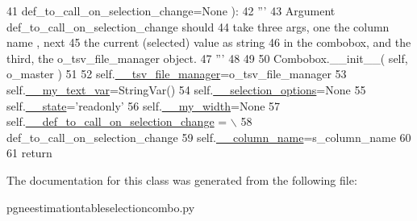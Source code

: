 \begin{DoxyCode}
41                         def\_to\_call\_on\_selection\_change=\textcolor{keywordtype}{None} ):
42         \textcolor{stringliteral}{'''}
43 \textcolor{stringliteral}{        Argument def\_to\_call\_on\_selection\_change should}
44 \textcolor{stringliteral}{        take three args, one the column name , next}
45 \textcolor{stringliteral}{        the current (selected) value as string }
46 \textcolor{stringliteral}{        in the combobox, and the third, the o\_tsv\_file\_manager object.}
47 \textcolor{stringliteral}{        '''}
48 
49 
50         Combobox.\_\_init\_\_( self, o\_master )
51 
52         self.\hyperlink{classnegui_1_1pgneestimationtableselectioncombo_1_1PGNeEstTableSelectionCombo_ab5d15ff71c8791901a27773d66d94359}{\_\_tsv\_file\_manager}=o\_tsv\_file\_manager
53         self.\hyperlink{classnegui_1_1pgneestimationtableselectioncombo_1_1PGNeEstTableSelectionCombo_ada055ddd07374f0f960635ba63ac1e38}{\_\_my\_text\_var}=StringVar()
54         self.\hyperlink{classnegui_1_1pgneestimationtableselectioncombo_1_1PGNeEstTableSelectionCombo_a6fd1aa0595a6574be037b1c238f12050}{\_\_selection\_options}=\textcolor{keywordtype}{None}
55         self.\hyperlink{classnegui_1_1pgneestimationtableselectioncombo_1_1PGNeEstTableSelectionCombo_a0e1a21c5238434cf3f5b68ca50c8b713}{\_\_state}=\textcolor{stringliteral}{'readonly'}
56         self.\hyperlink{classnegui_1_1pgneestimationtableselectioncombo_1_1PGNeEstTableSelectionCombo_a86582875e9c4a1de27b20214a29ea0b3}{\_\_my\_width}=\textcolor{keywordtype}{None}
57         self.\hyperlink{classnegui_1_1pgneestimationtableselectioncombo_1_1PGNeEstTableSelectionCombo_a2701122db20442068001696b29605626}{\_\_def\_to\_call\_on\_selection\_change} = \(\backslash\)
58                                     def\_to\_call\_on\_selection\_change
59         self.\hyperlink{classnegui_1_1pgneestimationtableselectioncombo_1_1PGNeEstTableSelectionCombo_a41636cd83eabdadc08a550c6101cb57d}{\_\_column\_name}=s\_column\_name
60 
61         \textcolor{keywordflow}{return}
\end{DoxyCode}


The documentation for this class was generated from the following file\+:\begin{DoxyCompactItemize}
\item 
pgneestimationtableselectioncombo.\+py\end{DoxyCompactItemize}
